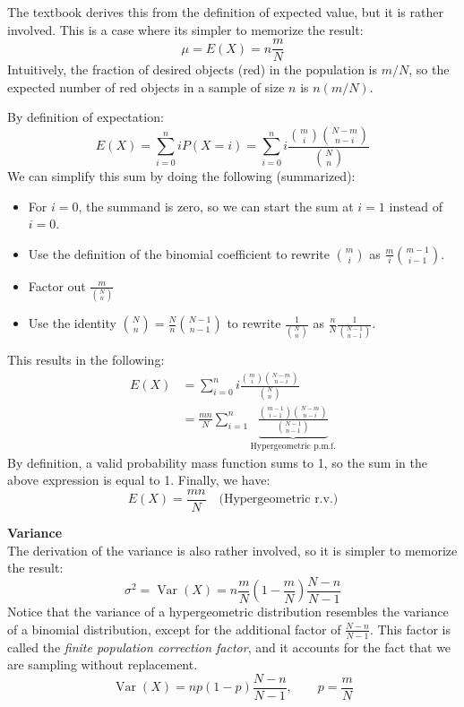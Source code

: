 ﻿\documentclass[12pt]{article}
\begin{document}
The textbook derives this from the definition of expected value, but it is rather involved. This is a case where its simpler to memorize the result:
\[
\boxed{\mu=E(X)=n\frac mN}
\]
Intuitively, the fraction of desired objects (red) in the population is $m/N$, so the expected number of red objects in a sample of size $n$ is $n(m/N)$.
\begin{notebox}
By definition of expectation:
\[
E(X)=\sum_{i=0}^{n}iP(X=i) =\sum_{i=0}^{n}i\frac{\binom{m}{i}\binom{N-m}{n-i}}{\binom{N}{n}}
\]
We can simplify this sum by doing the following (summarized):
\begin{itemize}
    \item For $i=0$, the summand is zero, so we can start the sum at $i=1$ instead of $i=0$.
    \item Use the definition of the binomial coefficient to rewrite $\binom{m}{i}$ as $\frac{m}{i}\binom{m-1}{i-1}$.
    \item Factor out $\frac{m}{\binom{N}{n}}$
    \item Use the identity $\binom{N}{n}=\frac{N}{n}\binom{N-1}{n-1}$ to rewrite $\frac{1}{\binom{N}{n}}$ as $\frac{n}{N}\frac{1}{\binom{N-1}{n-1}}$.
\end{itemize}
This results in the following:
\[
\begin{aligned}
E(X)
&=\sum_{i=0}^{n}i\frac{\binom{m}{i}\binom{N-m}{n-i}}{\binom{N}{n}}\\[6pt]
&=\frac{mn}{N}\sum_{i=1}^{n}
\underbrace{\frac{\binom{m-1}{i-1}\binom{N-m}{n-i}}{\binom{N-1}{n-1}}}_{\text{Hypergeometric p.m.f.}}
\end{aligned}
\]
By definition, a valid probability mass function sums to 1, so the sum in the above expression is equal to 1. Finally, we have:
\[E(X) = \frac{mn}{N} \quad \text{(Hypergeometric r.v.)}\]
\end{notebox}
\textbf{Variance}\\
The derivation of the variance is also rather involved, so it is simpler to memorize the result:
\[
\boxed{\sigma^2=\operatorname{Var}(X)=n\frac mN\left(1-\frac mN\right)\frac{N-n}{N-1}}
\]
Notice that the variance of a hypergeometric distribution resembles the variance of a binomial distribution, except for the additional factor of \(\frac{N-n}{N-1}\). This factor is called the \textit{finite population correction factor}, and it accounts for the fact that we are sampling without replacement.
\[
\operatorname{Var}(X)=np(1-p)\frac{N-n}{N-1},\qquad p=\frac mN
\]
\end{document}
